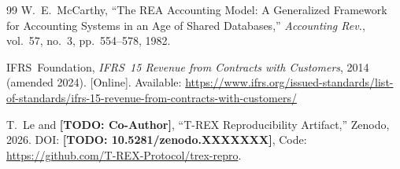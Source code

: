 \documentclass[journal]{IEEEtran}
\newcommand{\TODO}[1]{{\color{red}\textbf{[TODO: #1]}}}
\begin{document}
\begin{thebibliography}{99}
W.~E.~McCarthy, ``The REA Accounting Model: A Generalized Framework
for Accounting Systems in an Age of Shared Databases,''
\emph{Accounting Rev.}, vol.~57, no.~3, pp.~554--578, 1982.

IFRS~Foundation, \emph{IFRS~15 Revenue from Contracts with
Customers}, 2014 (amended 2024).
[Online]. Available:
\url{https://www.ifrs.org/issued-standards/list-of-standards/ifrs-15-revenue-from-contracts-with-customers/}

T.~Le and \TODO{Co-Author}, ``T-REX Reproducibility Artifact,''
Zenodo, 2026.
DOI: \TODO{10.5281/zenodo.XXXXXXX}, Code:
\url{https://github.com/T-REX-Protocol/trex-repro}.

\end{thebibliography}
\end{document}
